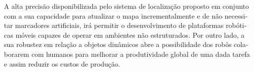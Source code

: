 \begin{otherlanguage}{portuguese}
A alta precisão disponibilizada pelo sistema de localização proposto em conjunto com a sua capacidade para atualizar o mapa incrementalmente e de não necessitar marcadores artificiais, irá permitir o desenvolvimento de plataformas robóticas móveis capazes de operar em ambientes não estruturados. Por outro lado, a sua robustez em relação a objetos dinâmicos abre a possibilidade dos robôs colaborarem com humanos para melhorar a produtividade global de uma dada tarefa e assim reduzir os custos de produção.

\end{otherlanguage}
